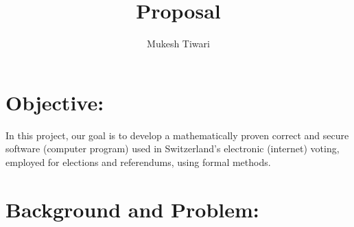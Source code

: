\documentclass[a4paper]{article}
\title{Proposal}
\author{Mukesh Tiwari}
\date{}
\begin{document}
\fontsize{11}{15}
\selectfont
\maketitle




\section{Objective:} 

In this project, our goal is to develop a mathematically proven correct 
and secure software (computer program) used in Switzerland's  electronic (internet)
voting, employed for elections  and referendums, using formal methods.

\section{Background and Problem:}
\end{document}
